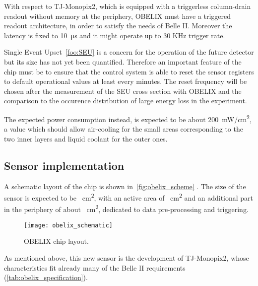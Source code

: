 With respect to TJ-Monopix2, which is equipped with a triggerless column-drain readout without memory at the periphery, OBELIX must have a triggered readout architecture, in order to satisfy the needs of Belle II. Moreover the latency is fixed to \SI{10}{\micro s} and it might operate up to 30 KHz trigger rate.

Single Event Upset~\autoref{foo:SEU} is a concern for the operation of the future detector but its size has not yet been quantified. Therefore an important feature of the chip must be to ensure that the control system is able to reset the sensor registers to default operational values at least every minutes. The reset frequency will be chosen after the measurement of the SEU cross section with OBELIX and the comparison to the occurence distribution of large energy loss in the experiment.

The expected power consumption instead, is expected to be about \SI{200}{mW/cm^{2}}, a value which should allow air-cooling for the small areas corresponding to the two inner layers and liquid coolant for the outer ones. 


\subsection{Sensor implementation}

A schematic layout of the chip is shown in~\autoref{fig:obelix_scheme} . The size of the sensor is expected to be ~\unit{cm^{2}}, with an active area of ~\unit{cm^{2}} and an additional part in the periphery of about ~\unit{cm^{2}}, dedicated to data pre-processing and triggering.

\begin{figure}[h!]
\centering
\texttt{[image: obelix\_schematic]}
\caption{OBELIX chip layout.}
\label{fig:obelix_scheme}
\end{figure}

As mentioned above, this new sensor is the development of TJ-Monopix2, whose characteristics fit already many of the Belle II requirements (\autoref{tab:obelix_specification}).\\

